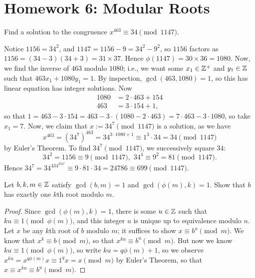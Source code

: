 \documentclass{article}
\begin{document}
\section*{Homework 6: Modular Roots}
\begin{exercise}
Find a solution to the congruence $x^{463} \equiv 34\pmod{1147}$.
\end{exercise}
\begin{solution}
Notice $1156 = 34^2$, and $1147 = 1156 - 9 = 34^2 - 9^2$, so $1156$ factors as $1156 = (34 - 3)(34 + 3) = 31\times 37$. Hence $\phi(1147) = 30\times 36 = 1080$. Now, we find the inverse of $463$ modulo $1080$; i.e., we want some $x_1\in \mathbb Z^+$ and $y_1\in \mathbb Z$ such that $463x_1 + 1080y_1 = 1$. By inspection, $\gcd(463, 1080) = 1$, so this has linear equation has integer solutions. Now
\begin{align*}
    1080 &= 2\cdot 463 + 154 \\
    463 &= 3\cdot 154 + 1,
\end{align*}
so that $1 = 463 - 3\cdot 154 = 463 - 3\cdot (1080 - 2\cdot 463) = 7\cdot 463 - 3\cdot 1080$, so take $x_1 = 7$. Now, we claim that $x := 34^7 \pmod{1147}$ is a solution, as we have
$$x^{463} = (34^7)^{463} = 34^{3\cdot 1080+1} \equiv 1^3 \cdot 34 = 34\pmod{1147}$$
by Euler's Theorem. To find $34^7 \pmod{1147}$, we successively square $34$:
$$34^2 = 1156 \equiv 9\pmod{1147},\,\, 34^4 \equiv 9^2= 81 \pmod{1147}.$$
Hence $34^7 = 34^434^234^1 \equiv 9\cdot 81\cdot 34 = 24786 \equiv \boxed{699} \pmod{1147}$.
\end{solution}

\newpage
\begin{exercise}[Chapter 17, \#3a]
Let $b,k,m\in\mathbb Z$ satisfy $\gcd(b,m) = 1$ and $\gcd(\phi(m), k) = 1$. Show that $b$ has exactly one $k$th root modulo $m$.
\end{exercise}
\begin{proof}
Since $\gcd(\phi(m), k) = 1$, there is some $u\in \mathbb Z$ such that $ku\equiv 1\pmod{\phi(m)}$, and this integer $u$ is unique up to equivalence modulo $n$. Let $x$ be any $k$th root of $b$ modulo $m$; it suffices to show $x\equiv b^u\pmod m$. We know that $x^k\equiv b\pmod m$, so that $x^{ku}\equiv b^u\pmod{m}$. But now we know $ku\equiv 1\pmod{\phi(m)}$, so write $ku = q\phi(m) + 1$, so we observe $x^{ku} = x^{q\phi(m)}x \equiv 1^qx = x\pmod m$ by Euler's Theorem, so that $x \equiv x^{ku}\equiv b^u\pmod m$.
\end{proof}
\end{document}
